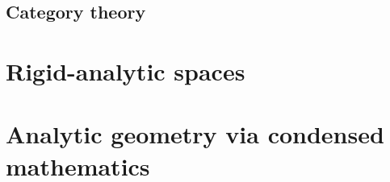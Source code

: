         \begin{appendices}
            \chapter{Category theory}
                \begin{abstract}
                    
                \end{abstract}
                
                \minitoc
                
                
        \end{appendices}
        
        \chapter{Rigid-analytic spaces}
            \begin{abstract}
                
            \end{abstract}
            
            \minitoc
            
            
            
            
            
        \chapter{Analytic geometry via condensed mathematics}
            \begin{abstract}
            
            \end{abstract}
            
            \minitoc
            
            
            
            

